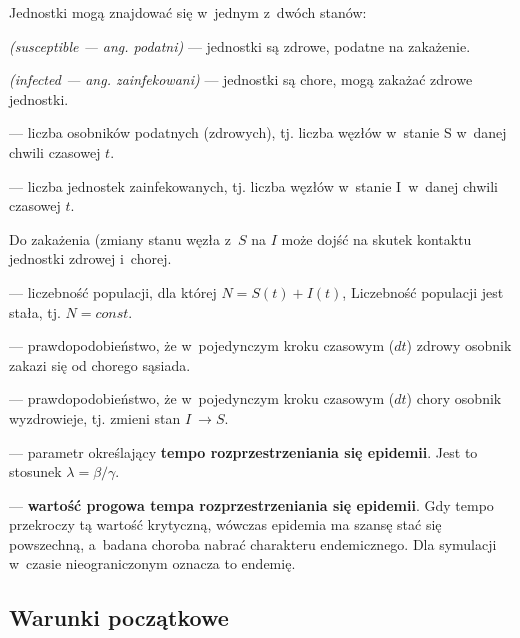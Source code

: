 \begin{description} \itemsep0pt
\item[$\bullet$] Jednostki mogą znajdować się w~jednym z~dwóch stanów:
  \begin{description} \itemsep0pt
  \item[S] \textit{(susceptible --- ang. podatni)} --- jednostki są zdrowe, podatne na zakażenie.
  \item[I] \textit{(infected --- ang. zainfekowani)} --- jednostki są chore, mogą zakażać zdrowe jednostki.
  \end{description}
\item[S(t)] --- liczba osobników podatnych (zdrowych), tj. liczba węzłów w~stanie S w~danej chwili czasowej $t$.
\item[I(t)] --- liczba jednostek zainfekowanych, tj. liczba węzłów w~stanie I~w~danej chwili czasowej $t$.
\item[$\bullet$] Do zakażenia (zmiany stanu węzła z~$S$ na $I$ może dojść na skutek kontaktu jednostki zdrowej i~chorej.
\item[N] --- liczebność populacji, dla której $N = S(t) + I(t)$, Liczebność populacji jest stała, tj. $N = \textit{const.}$

\item[$\pmb{\beta}$] --- prawdopodobieństwo, że w~pojedynczym kroku czasowym ($dt$) zdrowy osobnik zakazi się od chorego sąsiada.
\item[$\pmb{\gamma}$] --- prawdopodobieństwo, że w~pojedynczym kroku czasowym ($dt$) chory osobnik wyzdrowieje, tj. zmieni stan $ I~\rightarrow S $.
\item[$\pmb{\lambda}$] --- parametr określający \textbf{tempo rozprzestrzeniania się epidemii}. Jest to stosunek $\lambda = \beta / \gamma $.
\item[$\pmb{\lambda_c}$] --- \textbf{wartość progowa tempa rozprzestrzeniania się epidemii}. Gdy tempo przekroczy tą wartość krytyczną, wówczas epidemia ma szansę stać się powszechną, a~badana choroba nabrać charakteru endemicznego. Dla symulacji w~czasie nieograniczonym oznacza to endemię.

\end{description}


\subsection{Warunki początkowe}
\label{subsec:warunki_poczatkowe}

